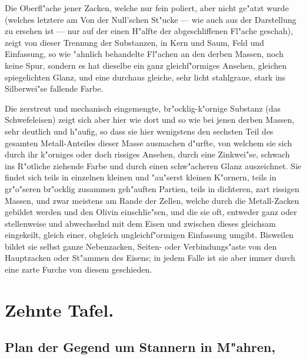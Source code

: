 \documentclass[a4paper, 11pt, oneside, german]{article}
\begin{document}
Die Oberfl"ache jener Zacken, welche nur fein poliert, aber nicht ge"atzt wurde (welches letztere am Von der Null'schen St"ucke --- wie auch aus der Darstellung zu ersehen ist --- nur auf der einen H"alfte der abgeschliffenen Fl"ache geschah), zeigt von dieser Trennung der Substanzen, in Kern und Saum, Feld und Einfassung, so wie "ahnlich behandelte Fl"achen an den derben Massen, noch keine Spur, sondern es hat dieselbe ein ganz gleichf"ormiges Ansehen, gleichen spiegelichten Glanz, und eine durchaus gleiche, sehr licht stahlgraue, stark ins Silberwei"se fallende Farbe.

Die zerstreut und mechanisch eingemengte, br"ocklig-k"ornige Substanz (das Schwefeleisen) zeigt sich aber hier wie dort und so wie bei jenen derben Massen, sehr deutlich und h"aufig, so dass sie hier wenigstens den sechsten Teil des gesamten Metall-Anteiles dieser Masse ausmachen d"urfte, von welchem sie sich durch ihr k"orniges oder doch rissiges Ansehen, durch eine Zinkwei"se, schwach ins R"otliche ziehende Farbe und durch einen schw"acheren Glanz auszeichnet. Sie findet sich teils in einzelnen kleinen und "au"serst kleinen K"ornern, teils in gr"o"seren br"ocklig zusammen geh"auften Partien, teils in dichteren, zart rissigen Massen, und zwar meistens am Rande der Zellen, welche durch die Metall-Zacken gebildet werden und den Olivin einschlie"sen, und die sie oft, entweder ganz oder stellenweise und abwechselnd mit dem Eisen und zwischen dieses gleichsam eingekeilt, gleich einer, obgleich ungleichf"ormigen Einfassung umgibt. Bisweilen bildet sie selbst ganze Nebenzacken, Seiten- oder Verbindungs"aste von den Hauptzacken oder St"ammen des Eisens; in jedem Falle ist sie aber immer durch eine zarte Furche von diesem geschieden.
\clearpage
\section{Zehnte Tafel.}
\subsection[Plan der Gegend um Stannern in M"ahren.]{Plan der Gegend um Stannern in M"ahren,}
\end{document}
